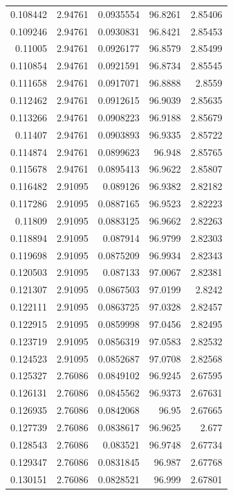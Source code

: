 \begin{tabular}{rrrrr}
 0.108442 & 2.94761 & 0.0935554 &  96.8261 & 2.85406 \\
 0.109246 & 2.94761 & 0.0930831 &  96.8421 & 2.85453 \\
  0.11005 & 2.94761 & 0.0926177 &  96.8579 & 2.85499 \\
 0.110854 & 2.94761 & 0.0921591 &  96.8734 & 2.85545 \\
 0.111658 & 2.94761 & 0.0917071 &  96.8888 &  2.8559 \\
 0.112462 & 2.94761 & 0.0912615 &  96.9039 & 2.85635 \\
 0.113266 & 2.94761 & 0.0908223 &  96.9188 & 2.85679 \\
  0.11407 & 2.94761 & 0.0903893 &  96.9335 & 2.85722 \\
 0.114874 & 2.94761 & 0.0899623 &   96.948 & 2.85765 \\
 0.115678 & 2.94761 & 0.0895413 &  96.9622 & 2.85807 \\
 0.116482 & 2.91095 &  0.089126 &  96.9382 & 2.82182 \\
 0.117286 & 2.91095 & 0.0887165 &  96.9523 & 2.82223 \\
  0.11809 & 2.91095 & 0.0883125 &  96.9662 & 2.82263 \\
 0.118894 & 2.91095 &  0.087914 &  96.9799 & 2.82303 \\
 0.119698 & 2.91095 & 0.0875209 &  96.9934 & 2.82343 \\
 0.120503 & 2.91095 &  0.087133 &  97.0067 & 2.82381 \\
 0.121307 & 2.91095 & 0.0867503 &  97.0199 &  2.8242 \\
 0.122111 & 2.91095 & 0.0863725 &  97.0328 & 2.82457 \\
 0.122915 & 2.91095 & 0.0859998 &  97.0456 & 2.82495 \\
 0.123719 & 2.91095 & 0.0856319 &  97.0583 & 2.82532 \\
 0.124523 & 2.91095 & 0.0852687 &  97.0708 & 2.82568 \\
 0.125327 & 2.76086 & 0.0849102 &  96.9245 & 2.67595 \\
 0.126131 & 2.76086 & 0.0845562 &  96.9373 & 2.67631 \\
 0.126935 & 2.76086 & 0.0842068 &    96.95 & 2.67665 \\
 0.127739 & 2.76086 & 0.0838617 &  96.9625 &   2.677 \\
 0.128543 & 2.76086 &  0.083521 &  96.9748 & 2.67734 \\
 0.129347 & 2.76086 & 0.0831845 &   96.987 & 2.67768 \\
 0.130151 & 2.76086 & 0.0828521 &   96.999 & 2.67801 \\

\end{tabular}
